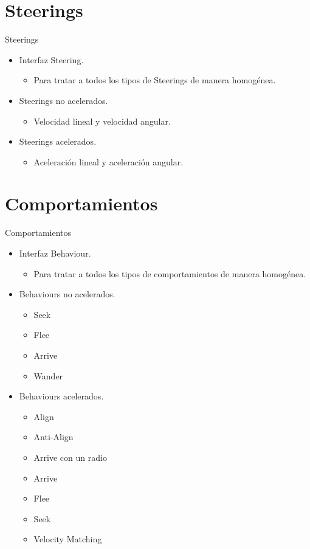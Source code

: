 \documentclass[10pt]{beamer}
\begin{document}
\section{Steerings}
\begin{frame}{Steerings}
\begin{itemize}[<+- | alert@+>]
	\item Interfaz Steering.
	\begin{itemize}[<+- | alert@+>]
  		\item Para tratar a todos los tipos de Steerings de manera homogénea.
 	\end{itemize}
 	\item Steerings no acelerados.
 	\begin{itemize}[<+- | alert@+>]
  		\item Velocidad lineal y velocidad angular.
 	\end{itemize}
 	\item Steerings acelerados.
 	\begin{itemize}[<+- | alert@+>]
  		\item Aceleración lineal y aceleración angular.
 	\end{itemize}
\end{itemize}
\end{frame}

\section{Comportamientos}
\begin{frame}{Comportamientos}
\begin{itemize}[<+- | alert@+>]
	\item Interfaz Behaviour.
	\begin{itemize}[<+- | alert@+>]
  		\item Para tratar a todos los tipos de comportamientos de manera homogénea.
 	\end{itemize}
 	\item Behaviours no acelerados.
 	\begin{itemize}[<+- | alert@+>]
  		\item Seek \item Flee \item Arrive \item Wander 
 	\end{itemize}
 	\item Behaviours acelerados.
 	\begin{itemize}[<+- | alert@+>]
  		\item Align \item Anti-Align \item Arrive con un radio \item Arrive \item Flee \item Seek \item Velocity Matching
 	\end{itemize}
\end{itemize}
\end{frame}
\end{document}
